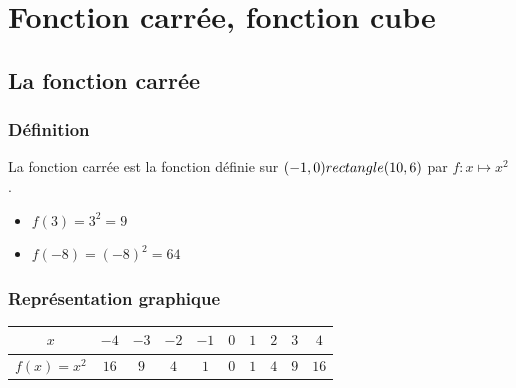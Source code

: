 



\chapter{Fonction carrée, fonction cube}



\section{La fonction carrée}
\subsection{Définition}
  \begin{minipage}[c]{0.6\linewidth}
\begin{Définition}
La fonction carrée est la fonction définie sur $(-1,0) rectangle (10,6)$ par $f:x\mapsto x^2$.
\end{Définition}
  \end{minipage} \hfill
  \begin{minipage}[c]{0.33\linewidth}
  \begin{Exemple}
  \leavevmode\vspace{-\baselineskip}
\begin{itemize}[label=\textcolor{Couleur8}{$\bullet$}]
\item $f(3)=3^2=9$ 
\item $f(-8)=(-8)^2=64$
\end{itemize}
\end{Exemple}
  \end{minipage}


\subsection{Représentation graphique}
\begin{center}

\begin{tabular}{|c|c|c|c|c|c|c|c|c|c|}
\arrayrulecolor{Couleur6} \hline
$x$ & $-4$ & $-3$ & $-2$ & $-1$ & $0$ & $1$ & $2$ & $3$ & $4$\\
\hline
$f(x)=x^2$ & $16$ & $9$ & $4$ & $1$ & $0$ & $1$ & $4$ & $9$ & $16$\\
\hline

\end{tabular}
\end{center}

